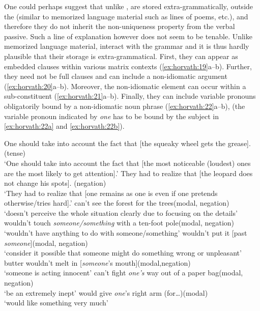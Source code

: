 \documentclass[output=paper,
modfonts
]{LSP/langsci}
\begin{document}
One could perhaps suggest that unlike ,  are
stored extra-grammatically, outside the  (similar to
memorized language material such as lines of poems, etc.), and therefore
they do not inherit the non-uniqueness property from the verbal passive.
Such a line of explanation however does not seem to be tenable. Unlike
memorized language material,  interact with the grammar
and it is thus hardly plausible that their storage is extra-grammatical.
First, they can appear as embedded clauses within various matrix
contexts (\ref{ex:horvath:19}a--b). Further, they need not be full clauses and can include
a non-idiomatic argument (\ref{ex:horvath:20}a--b). Moreover, the non-idiomatic element
can occur within a sub-constituent (\ref{ex:horvath:21}a--b). Finally, they can include
variable pronouns obligatorily bound by a non-idiomatic noun phrase
(\ref{ex:horvath:22}a--b), (the variable pronoun indicated by \emph{one} has to be bound
by the subject in \ref{ex:horvath:22a} and \ref{ex:horvath:22b}).
\largerpage

\ea \label{ex:horvath:19} 
	\ea \label{ex:horvath:19a} One should take into account the fact that {[}the squeaky wheel
	gets the grease{]}.\hfill (tense)\\
	`One should take into account the fact that {[}the most noticeable
	(loudest) ones are the most likely to get attention{]}.'
	\ex \label{ex:horvath:19b} They had to realize that {[}the leopard does not change his spots{]}. \hfill(negation)\\
	`They had to realize that {[}one remains as one is even if one pretends
	otherwise/tries hard{]}.'
	\z
\ex \label{ex:horvath:20} 
	\ea \label{ex:horvath:20a} can't see the forest for the trees\hfill (modal, negation)\\
	 `doesn't perceive the whole situation clearly due to focusing on the details'
	\ex \label{ex:horvath:20b} wouldn't touch \emph{someone/something} with a ten-foot pole\hfill (modal,
	negation)\\
	`wouldn't have anything to do with someone/something'
	\z
\ex \label{ex:horvath:21}
	\ea \label{ex:horvath:21a} wouldn't put it {[}past \emph{someone}{]}\hfill (modal, negation)\\
	`consider it possible that someone might do something wrong or
	unpleasant'
	\ex \label{ex:horvath:21b} butter wouldn't melt in {[}\emph{someone}'s mouth{]}\hfill (modal,negation)\\
	`someone is acting innocent'
	\z
\ex \label{ex:horvath:22}
	\ea \label{ex:horvath:22a} can't fight \emph{one's} way out of a paper bag\hfill (modal, negation)\\
	`be an extremely inept'
	\ex \label{ex:horvath:22b} would give \emph{one}'s right arm (for\ldots{})\hfill (modal)\\
	`would like something very much'
	\z
\z
\end{document}
